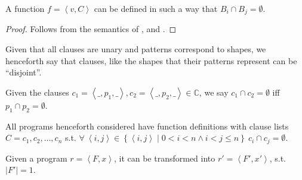 \begin{theorem} A function $f = \left\langle v, C \right\rangle$ can be defined
in such a way that $B_i\cap B_j=\emptyset$.\end{theorem}

\begin{proof} Follows from the semantics of \D{},
 and . \end{proof}

Given that all clauses are unary and patterns correspond to shapes, we
henceforth say that clauses, like the shapes that their patterns represent can
be ``disjoint''.

\begin{definition} Given the clauses $c_1 = \left\langle \_, p_1, \_
\right\rangle, c_2 = \left\langle \_, p_2, \_ \right\rangle\in \mathbb{C} $, we
say $c_1\cap c_2 = \emptyset$ iff $p_1\cap p_2 = \emptyset$.\end{definition}

\begin{definition}\label{definition:nice-3} All programs henceforth considered
have function definitions with clause lists $C=c_1,c_2,\ldots,c_n$ s.t.
$\forall\ \left\langle i,j \right\rangle \in \left\{ \left\langle i, j
\right\rangle \mid 0 < i < n \wedge i < j \leq n \right\}\ c_i \cap c_j =
\emptyset $.\end{definition}

\begin{lemma}\label{lemma:program-many-to-one} Given a program $r =
\left\langle F, x\right\rangle$, it can be transformed into $r'=\left\langle
F',x' \right\rangle$, s.t. $|F'|=1$.\end{lemma}

